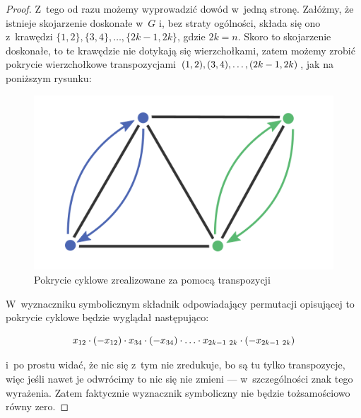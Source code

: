 \begin{proof}
	Z~tego od razu możemy wyprowadzić dowód w~jedną stronę. Załóżmy, że istnieje skojarzenie doskonałe w~$G$ i, bez straty ogólności, składa się ono z~krawędzi $\{1, 2\}, \{3, 4\}, \ldots, \{2k - 1, 2k\}$, gdzie $2k = n$. Skoro to skojarzenie doskonałe, to te krawędzie nie dotykają się wierzchołkami, zatem możemy zrobić pokrycie wierzchołkowe transpozycjami $\pars{1, 2}, \pars{3, 4}, \ldots, \pars{2k - 1, 2k}$, jak na poniższym rysunku:

	\begin{figure}[H]
		\centering
		\includegraphics[scale=0.75]{images/tutte/perfect_matching_cover.png}
		\caption{Pokrycie cyklowe zrealizowane za pomocą transpozycji}
	\end{figure}

	W~wyznaczniku symbolicznym składnik odpowiadający permutacji opisującej to pokrycie cyklowe będzie wyglądał następująco:

	\begin{equation*}
		x_{12} \cdot \left(-x_{12}\right) \cdot x_{34} \cdot \left(-x_{34}\right) \cdot \ldots \cdot x_{2k - 1\ 2k} \cdot \left(-x_{2k - 1\ 2k}\right)
	\end{equation*}

	i~po prostu widać, że nic się z~tym nie zredukuje, bo są tu tylko transpozycje, więc jeśli nawet je odwrócimy to nic się nie zmieni --- w~szczególności znak tego wyrażenia. Zatem faktycznie wyznacznik symboliczny nie będzie tożsamościowo równy zero.


\end{proof}

